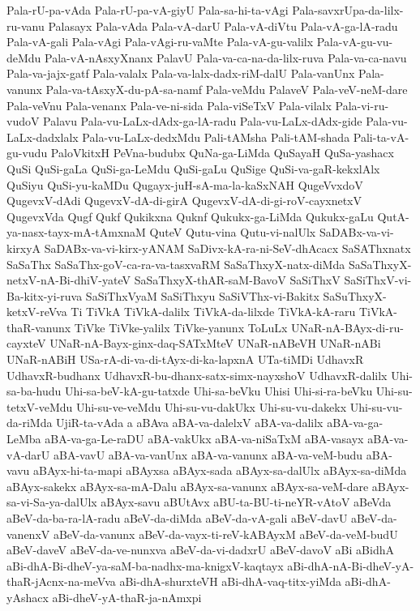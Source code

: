 {Pala-rU-pa-vAda
Pala-rU-pa-vA-giyU
Pala-sa-hi-ta-vAgi
Pala-savxrUpa-da-lilx-ru-vanu
Palasayx
Pala-vAda
Pala-vA-darU
Pala-vA-diVtu
Pala-vA-ga-lA-radu
Pala-vA-gali
Pala-vAgi
Pala-vAgi-ru-vaMte
Pala-vA-gu-valilx
Pala-vA-gu-vu-deMdu
Pala-vA-nAsxyXnanx
PalavU
Pala-va-ca-na-da-lilx-ruva
Pala-va-ca-navu
Pala-va-jajx-gatf
Pala-valalx
Pala-va-lalx-dadx-riM-dalU
Pala-vanUnx
Pala-vanunx
Pala-va-tAsxyX-du-pA-sa-namf
Pala-veMdu
PalaveV
Pala-veV-neM-dare
Pala-veVnu
Pala-venanx
Pala-ve-ni-sida
Pala-viSeTxV
Pala-vilalx
Pala-vi-ru-vudoV
Palavu
Pala-vu-LaLx-dAdx-ga-lA-radu
Pala-vu-LaLx-dAdx-gide
Pala-vu-LaLx-dadxlalx
Pala-vu-LaLx-dedxMdu
Pali-tAMsha
Pali-tAM-shada
Pali-ta-vA-gu-vudu
PaloVkitxH
PeVna-budubx
QuNa-ga-LiMda
QuSayaH
QuSa-yashacx
QuSi
QuSi-gaLa
QuSi-ga-LeMdu
QuSi-gaLu
QuSige
QuSi-va-gaR-kekxlAlx
QuSiyu
QuSi-yu-kaMDu
Qugayx-juH-sA-ma-la-kaSxNAH
QugeVvxdoV
QugevxV-dAdi
QugevxV-dA-di-girA
QugevxV-dA-di-gi-roV-cayxnetxV
QugevxVda
Qugf
Qukf
Qukikxna
Quknf
Qukukx-ga-LiMda
Qukukx-gaLu
QutA-ya-nasx-tayx-mA-tAmxnaM
QuteV
Qutu-vina
Qutu-vi-nalUlx
SaDABx-va-vi-kirxyA
SaDABx-va-vi-kirx-yANAM
SaDivx-kA-ra-ni-SeV-dhAcacx
SaSAThxnatx
SaSaThx
SaSaThx-goV-ca-ra-va-tasxvaRM
SaSaThxyX-natx-diMda
SaSaThxyX-netxV-nA-Bi-dhiV-yateV
SaSaThxyX-thAR-saM-BavoV
SaSiThxV
SaSiThxV-vi-Ba-kitx-yi-ruva
SaSiThxVyaM
SaSiThxyu
SaSiVThx-vi-Bakitx
SaSuThxyX-ketxV-reVva
Ti
TiVkA
TiVkA-dalilx
TiVkA-da-lilxde
TiVkA-kA-raru
TiVkA-thaR-vanunx
TiVke
TiVke-yalilx
TiVke-yanunx
ToLuLx
UNaR-nA-BAyx-di-ru-cayxteV
UNaR-nA-Bayx-ginx-daq-SATxMteV
UNaR-nABeVH
UNaR-nABi
UNaR-nABiH
USa-rA-di-va-di-tAyx-di-ka-lapxnA
UTa-tiMDi
UdhavxR
UdhavxR-budhanx
UdhavxR-bu-dhanx-satx-simx-nayxshoV
UdhavxR-dalilx
Uhi-sa-ba-hudu
Uhi-sa-beV-kA-gu-tatxde
Uhi-sa-beVku
Uhisi
Uhi-si-ra-beVku
Uhi-su-tetxV-veMdu
Uhi-su-ve-veMdu
Uhi-su-vu-dakUkx
Uhi-su-vu-dakekx
Uhi-su-vu-da-riMda
UjiR-ta-vAda
a
aBAva
aBA-va-dalelxV
aBA-va-dalilx
aBA-va-ga-LeMba
aBA-va-ga-Le-raDU
aBA-vakUkx
aBA-va-niSaTxM
aBA-vasayx
aBA-va-vA-darU
aBA-vavU
aBA-va-vanUnx
aBA-va-vanunx
aBA-va-veM-budu
aBA-vavu
aBAyx-hi-ta-mapi
aBAyxsa
aBAyx-sada
aBAyx-sa-dalUlx
aBAyx-sa-diMda
aBAyx-sakekx
aBAyx-sa-mA-Dalu
aBAyx-sa-vanunx
aBAyx-sa-veM-dare
aBAyx-sa-vi-Sa-ya-dalUlx
aBAyx-savu
aBUtAvx
aBU-ta-BU-ti-neYR-vAtoV
aBeVda
aBeV-da-ba-ra-lA-radu
aBeV-da-diMda
aBeV-da-vA-gali
aBeV-davU
aBeV-da-vanenxV
aBeV-da-vanunx
aBeV-da-vayx-ti-reV-kABAyxM
aBeV-da-veM-budU
aBeV-daveV
aBeV-da-ve-nunxva
aBeV-da-vi-dadxrU
aBeV-davoV
aBi
aBidhA
aBi-dhA-Bi-dheV-ya-saM-ba-nadhx-ma-knigxV-kaqtayx
aBi-dhA-nA-Bi-dheV-yA-thaR-jAcnx-na-meVva
aBi-dhA-shurxteVH
aBi-dhA-vaq-titx-yiMda
aBi-dhA-yAshacx
aBi-dheV-yA-thaR-ja-nAmxpi
}

